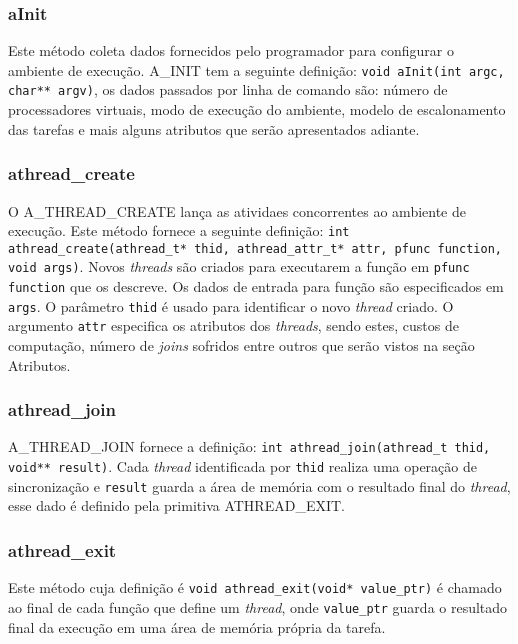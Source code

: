 \documentclass[12pt]{article} usepackage{sbc-template} usepackage{graphicx,url}
\begin{document}
\subsubsection*{aInit}

Este método coleta dados fornecidos pelo programador para configurar o ambiente de execução. A\_INIT tem a seguinte definição: 
\texttt{void aInit(int argc, char** argv)}, os dados passados por linha de comando são: número de processadores virtuais, modo de 
execução do ambiente, modelo de escalonamento das tarefas e mais alguns atributos que serão apresentados adiante.

\subsubsection*{athread\_create}

O A\_THREAD\_CREATE lança as atividaes concorrentes ao ambiente de execução. Este método fornece a seguinte definição: 
\texttt{int athread\_create(athread\_t* thid, athread\_attr\_t* attr, pfunc function, void\* args)}. Novos \emph{threads} são criados
para executarem a função em \texttt{pfunc function} que os descreve. Os dados de entrada para função são especificados em \texttt{args}.
O parâmetro \texttt{thid} é usado para identificar o novo \emph{thread} criado. O argumento \texttt{attr} especifica os atributos dos 
\emph{threads}, sendo estes, custos de computação, número de \emph{joins} sofridos entre outros que serão vistos na seção Atributos.

\subsubsection*{athread\_join}

A\_THREAD\_JOIN fornece a definição: \texttt{int athread\_join(athread\_t thid, void** result)}. Cada \emph{thread} identificada por
\texttt{thid} realiza uma operação de sincronização e \texttt{result} guarda a área de memória com o resultado final do \emph{thread}, 
esse dado é definido pela primitiva ATHREAD\_EXIT.

\subsubsection*{athread\_exit}

Este método cuja definição é \texttt{void athread\_exit(void* value\_ptr)} é chamado ao final de cada função que define um \emph{thread},
onde \texttt{value\_ptr} guarda o resultado final da execução em uma área de memória própria da tarefa.
\end{document}
